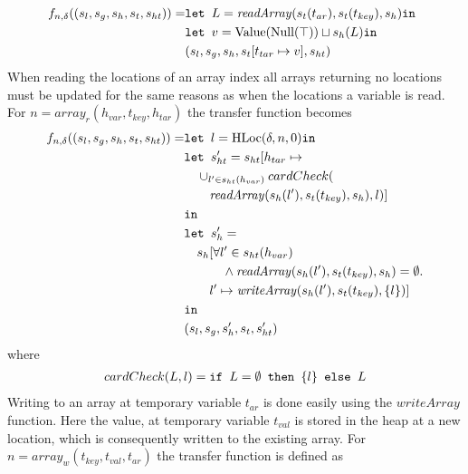 \begin{align}
f_{n,\delta}((s_l, s_g, s_h, s_t, s_{ht})) =   &\texttt{let } L = \mathit{readArray}(s_t(t_{ar}), s_t(t_{key}) ,s_h) \texttt{in }\notag\\
                                    &\texttt{let } v = \text{Value}(\text{Null}(\top))\sqcup s_h(L) \texttt{in }\notag\\
                                    &  (s_l, s_g, s_h, s_t[t_{tar}\mapsto v], s_{ht})
\end{align}
When reading the locations of an array index all arrays returning no locations must be updated for the same reasons as when the locations a variable is read. For $n = \mathit{array}_r(h_{var},t_{key},h_{tar})$ the transfer function becomes
\begin{align}
f_{n,\delta}((s_l, s_g, s_h, s_t, s_{ht})) =   &\texttt{let } l = \text{HLoc}(\delta, n, 0) \texttt{in }\notag\\
                                    &\texttt{let } s_{ht}' = s_{ht}[h_{tar} \mapsto \notag\\
                                    & \quad \cup_{l'\in s_{ht}(h_{var})}cardCheck(\notag\\
                                    &\quad\quad \mathit{readArray}(s_h(l'), s_t(t_{key}), s_h), l)]\notag\\
                                    & \texttt{in }\notag\\
                                    &\texttt{let } s_h' = \notag\\
                                    &\quad s_h[\forall l' \in s_{ht}(h_{var}) \notag\\
                                    &\quad\quad\quad\wedge \mathit{readArray}(s_h(l'), s_t(t_{key}), s_h) = \emptyset.\notag\\
                                    &\quad\quad l' \mapsto \mathit{writeArray}(s_h(l'), s_t(t_{key}), \{l\})]\notag\\
                                    & \texttt{in }\notag\\
                                    &(s_l, s_g, s_h', s_t, s_{ht}')
\end{align}
where 
\begin{align}
cardCheck(L, l) = \texttt{if }L = \emptyset\texttt{ then } \{l\} \texttt{ else } L
\end{align}
Writing to an array at temporary variable $t_{ar}$ is done easily using the $\mathit{writeArray}$ function. Here the value, at temporary variable $t_{val}$ is stored in the heap at a new location, which is consequently written to the existing array. For $n = \mathit{array}_w(t_{key},t_{val},t_{ar})$ the transfer function is defined as
